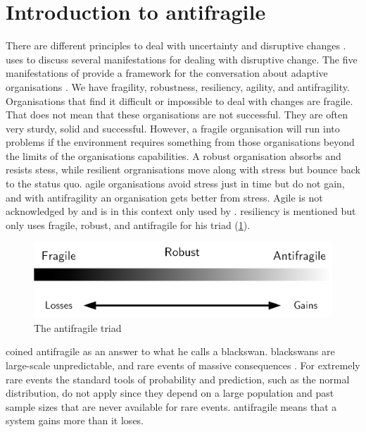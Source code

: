 \section{Introduction to antifragile}
\label{sec:introantifragility}
There are different principles to deal with uncertainty and disruptive changes \parencite[pp.~79--81]{Steen2018}.  uses \textcite{Taleb2012} to discuss several manifestations for dealing with disruptive change. The five manifestations of \textcite{Taleb2012} provide a framework for the conversation about adaptive organisations \parencite[pp.~79--81]{Steen2018}. We have \gls{fragility}, \gls{robustness}, \gls{resiliency}, \gls{agility}, and \gls{antifragility}. Organisations that find it difficult or impossible to deal with changes are fragile. That does not mean that these organisations are not successful. They are often very sturdy, solid and successful. However, a fragile organisation will run into problems if the environment requires something from those organisations beyond the limits of the organisations capabilities. A \gls{robust} organisation absorbs and resists stess, while \gls{resilient} orgranisations move along with stress but bounce back to the status quo. \Gls{agile} organisations avoid stress just in time but do not gain, and with \gls{antifragility} an organisation gets better from stress. Agile is not acknowledged by \textcite{Taleb2012} and is in this context only used by \textcite{Steen2018}. \Gls{resiliency} is mentioned but \textcite{Taleb2012} only uses \gls{fragile}, \gls{robust}, and \gls{antifragile} for his \gls{triad} (\cref{fig:antifragilesimple}).
\begin{figure}[H]
	\centering
	\includegraphics[width=0.6\linewidth]{images/antifragilesimple}
	\caption[The antifragile triad]{The antifragile triad}
	\label{fig:antifragilesimple}
\end{figure}
\textcite{Taleb2012} coined \gls{antifragile} as an answer to what he calls a \gls{blackswan}. \Glspl{blackswan} are large-scale unpredictable, and rare events of massive consequences \parencite[p.~6]{Taleb2012}. For extremely rare events the standard tools of probability and prediction, such as the normal distribution, do not apply since they depend on a large population and past sample sizes that are never available for rare events. \Gls{antifragile} means that a system gains more than it loses.

